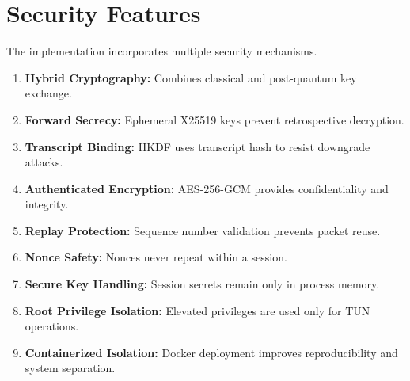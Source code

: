 \section{Security Features}
\label{sec:security_features}

The implementation incorporates multiple security mechanisms.

\begin{enumerate}
    \item \textbf{Hybrid Cryptography:} Combines classical and post-quantum key exchange.
    
    \item \textbf{Forward Secrecy:} Ephemeral X25519 keys prevent retrospective decryption.
    
    \item \textbf{Transcript Binding:} HKDF uses transcript hash to resist downgrade attacks.
    
    \item \textbf{Authenticated Encryption:} AES-256-GCM provides confidentiality and integrity.
    
    \item \textbf{Replay Protection:} Sequence number validation prevents packet reuse.
    
    \item \textbf{Nonce Safety:} Nonces never repeat within a session.
    
    \item \textbf{Secure Key Handling:} Session secrets remain only in process memory.
    
    \item \textbf{Root Privilege Isolation:} Elevated privileges are used only for TUN operations.
    
    \item \textbf{Containerized Isolation:} Docker deployment improves reproducibility and system separation.
\end{enumerate}